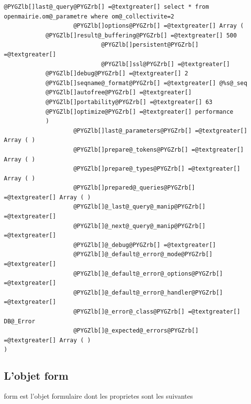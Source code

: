 \documentclass[letterpaper,10pt,french]{manual}
\begin{document}
\begin{Verbatim}[commandchars=@\[\]]
                    @PYGZlb[]last@_query@PYGZrb[] =@textgreater[] select * from openmairie.om@_parametre where om@_collectivite=2
                    @PYGZlb[]options@PYGZrb[] =@textgreater[] Array (
            @PYGZlb[]result@_buffering@PYGZrb[] =@textgreater[] 500
                            @PYGZlb[]persistent@PYGZrb[] =@textgreater[]
                            @PYGZlb[]ssl@PYGZrb[] =@textgreater[]
            @PYGZlb[]debug@PYGZrb[] =@textgreater[] 2
            @PYGZlb[]seqname@_format@PYGZrb[] =@textgreater[] @%s@_seq
            @PYGZlb[]autofree@PYGZrb[] =@textgreater[]
            @PYGZlb[]portability@PYGZrb[] =@textgreater[] 63
            @PYGZlb[]optimize@PYGZrb[] =@textgreater[] performance
            )
                    @PYGZlb[]last@_parameters@PYGZrb[] =@textgreater[] Array ( )
                    @PYGZlb[]prepare@_tokens@PYGZrb[] =@textgreater[] Array ( )
                    @PYGZlb[]prepare@_types@PYGZrb[] =@textgreater[] Array ( )
                    @PYGZlb[]prepared@_queries@PYGZrb[] =@textgreater[] Array ( )
                    @PYGZlb[]@_last@_query@_manip@PYGZrb[] =@textgreater[]
                    @PYGZlb[]@_next@_query@_manip@PYGZrb[] =@textgreater[]
                    @PYGZlb[]@_debug@PYGZrb[] =@textgreater[]
                    @PYGZlb[]@_default@_error@_mode@PYGZrb[] =@textgreater[]
                    @PYGZlb[]@_default@_error@_options@PYGZrb[] =@textgreater[]
                    @PYGZlb[]@_default@_error@_handler@PYGZrb[] =@textgreater[]
                    @PYGZlb[]@_error@_class@PYGZrb[] =@textgreater[] DB@_Error
                    @PYGZlb[]@_expected@_errors@PYGZrb[] =@textgreater[] Array ( )
)
\end{Verbatim}


\subsection{L'objet form}

form est l'objet formulaire dont les proprietes sont les suivantes
\end{document}

